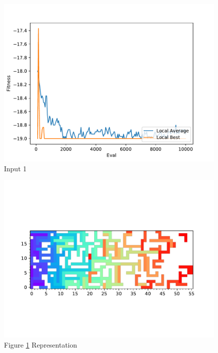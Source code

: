 \documentclass{standalone}
\begin{document}
\begin{figure}[!htb]
	\caption{Input 1}
	\label{fig:graph_1007}
	\includegraphics[width=\textwidth]{../graphs/graphs/1007.pdf}
\end{figure}


\begin{figure}[!htb]
	\caption{Figure \ref{fig:graph_1007} Representation}
	\label{fig:picture_1007}
	\includegraphics[width=\textwidth]{../graphs/picture/1007.pdf}
\end{figure}
\end{document}
